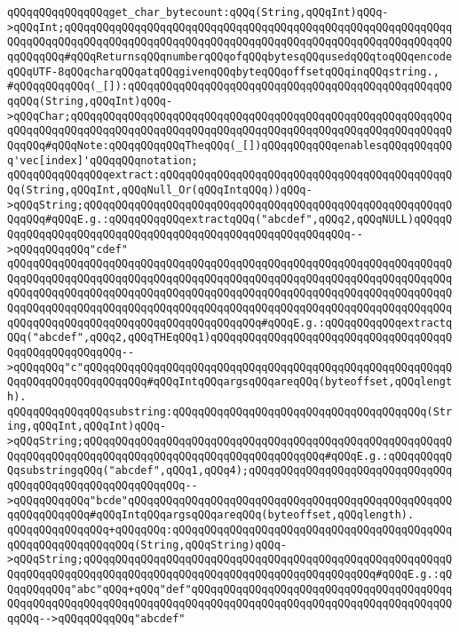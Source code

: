 \verb|qQQqqQQqqQQqqQQqget_char_bytecount:qQQq(String,qQQqInt)qQQq->qQQqInt;qQQqqQQqqQQqqQQqqQQqqQQqqQQqqQQqqQQqqQQqqQQqqQQqqQQqqQQqqQQqqQQqqQQqqQQqqQQqqQQqqQQqqQQqqQQqqQQqqQQqqQQqqQQqqQQqqQQqqQQqqQQqqQQqqQQqqQQqqQQq#qQQqReturnsqQQqnumberqQQqofqQQqbytesqQQqusedqQQqtoqQQqencodeqQQqUTF-8qQQqcharqQQqatqQQqgivenqQQqbyteqQQqoffsetqQQqinqQQqstring.,|\newline
\verb|#qQQqqQQqqQQq(_[]):qQQqqQQqqQQqqQQqqQQqqQQqqQQqqQQqqQQqqQQqqQQqqQQqqQQqqQQq(String,qQQqInt)qQQq->qQQqChar;qQQqqQQqqQQqqQQqqQQqqQQqqQQqqQQqqQQqqQQqqQQqqQQqqQQqqQQqqQQqqQQqqQQqqQQqqQQqqQQqqQQqqQQqqQQqqQQqqQQqqQQqqQQqqQQqqQQqqQQqqQQqqQQqqQQqqQQq#qQQqNote:qQQqqQQqqQQqTheqQQq(_[])qQQqqQQqqQQqenablesqQQqqQQqqQQq'vec[index]'qQQqqQQqnotation;|\newline
\newline
\verb|qQQqqQQqqQQqqQQqextract:qQQqqQQqqQQqqQQqqQQqqQQqqQQqqQQqqQQqqQQqqQQqqQQq(String,qQQqInt,qQQqNull_Or(qQQqIntqQQq))qQQq->qQQqString;qQQqqQQqqQQqqQQqqQQqqQQqqQQqqQQqqQQqqQQqqQQqqQQqqQQqqQQqqQQqqQQq#qQQqE.g.:qQQqqQQqqQQqextractqQQq("abcdef",qQQq2,qQQqNULL)qQQqqQQqqQQqqQQqqQQqqQQqqQQqqQQqqQQqqQQqqQQqqQQqqQQqqQQqqQQq-->qQQqqQQqqQQq"cdef"|\newline
\verb|qQQqqQQqqQQqqQQqqQQqqQQqqQQqqQQqqQQqqQQqqQQqqQQqqQQqqQQqqQQqqQQqqQQqqQQqqQQqqQQqqQQqqQQqqQQqqQQqqQQqqQQqqQQqqQQqqQQqqQQqqQQqqQQqqQQqqQQqqQQqqQQqqQQqqQQqqQQqqQQqqQQqqQQqqQQqqQQqqQQqqQQqqQQqqQQqqQQqqQQqqQQqqQQqqQQqqQQqqQQqqQQqqQQqqQQqqQQqqQQqqQQqqQQqqQQqqQQqqQQqqQQqqQQqqQQqqQQqqQQqqQQqqQQqqQQqqQQqqQQqqQQqqQQqqQQqqQQqqQQq#qQQqE.g.:qQQqqQQqqQQqextractqQQq("abcdef",qQQq2,qQQqTHEqQQq1)qQQqqQQqqQQqqQQqqQQqqQQqqQQqqQQqqQQqqQQqqQQqqQQqqQQqqQQq-->qQQqqQQq"c"qQQqqQQqqQQqqQQqqQQqqQQqqQQqqQQqqQQqqQQqqQQqqQQqqQQqqQQqqQQqqQQqqQQqqQQqqQQqqQQq#qQQqIntqQQqargsqQQqareqQQq(byteoffset,qQQqlength).|\newline
\verb|qQQqqQQqqQQqqQQqsubstring:qQQqqQQqqQQqqQQqqQQqqQQqqQQqqQQqqQQqqQQq(String,qQQqInt,qQQqInt)qQQq->qQQqString;qQQqqQQqqQQqqQQqqQQqqQQqqQQqqQQqqQQqqQQqqQQqqQQqqQQqqQQqqQQqqQQqqQQqqQQqqQQqqQQqqQQqqQQqqQQqqQQqqQQqqQQqqQQq#qQQqE.g.:qQQqqQQqqQQqsubstringqQQq("abcdef",qQQq1,qQQq4);qQQqqQQqqQQqqQQqqQQqqQQqqQQqqQQqqQQqqQQqqQQqqQQqqQQqqQQqqQQq-->qQQqqQQqqQQq"bcde"qQQqqQQqqQQqqQQqqQQqqQQqqQQqqQQqqQQqqQQqqQQqqQQqqQQqqQQqqQQqqQQq#qQQqIntqQQqargsqQQqareqQQq(byteoffset,qQQqlength).|\newline
\newline
\verb|qQQqqQQqqQQqqQQq+qQQqqQQq:qQQqqQQqqQQqqQQqqQQqqQQqqQQqqQQqqQQqqQQqqQQqqQQqqQQqqQQqqQQqqQQq(String,qQQqString)qQQq->qQQqString;qQQqqQQqqQQqqQQqqQQqqQQqqQQqqQQqqQQqqQQqqQQqqQQqqQQqqQQqqQQqqQQqqQQqqQQqqQQqqQQqqQQqqQQqqQQqqQQqqQQqqQQqqQQqqQQqqQQq#qQQqE.g.:qQQqqQQqqQQq"abc"qQQq+qQQq"def"qQQqqQQqqQQqqQQqqQQqqQQqqQQqqQQqqQQqqQQqqQQqqQQqqQQqqQQqqQQqqQQqqQQqqQQqqQQqqQQqqQQqqQQqqQQqqQQqqQQqqQQqqQQqqQQqqQQq-->qQQqqQQqqQQq"abcdef"|\newline
